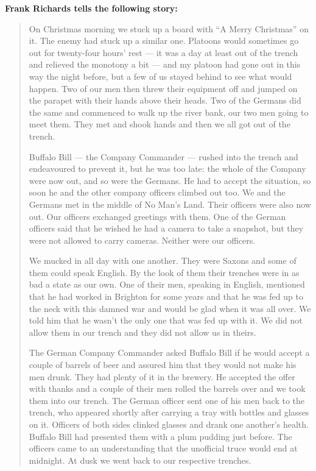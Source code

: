 \vspace{0.5em}

\textbf{Frank Richards tells the following story:}


\begin{quote}
On Christmas morning we stuck up a board with “A Merry Christmas” on it. The enemy had stuck up a similar one. Platoons would sometimes go out for twenty-four hours’ rest — it was a day at least out of the trench and relieved the monotony a bit — and my platoon had gone out in this way the night before, but a few of us stayed behind to see what would happen. Two of our men then threw their equipment off and jumped on the parapet with their hands above their heads. Two of the Germans did the same and commenced to walk up the river bank, our two men going to meet them. They met and shook hands and then we all got out of the trench.

Buffalo Bill — the Company Commander — rushed into the trench and endeavoured to prevent it, but he was too late: the whole of the Company were now out, and so were the Germans. He had to accept the situation, so soon he and the other company officers climbed out too. We and the Germans met in the middle of No Man’s Land. Their officers were also now out. Our officers exchanged greetings with them. One of the German officers said that he wished he had a camera to take a snapshot, but they were not allowed to carry cameras. Neither were our officers.

We mucked in all day with one another. They were Saxons and some of them could speak English. By the look of them their trenches were in as bad a state as our own. One of their men, speaking in English, mentioned that he had worked in Brighton for some years and that he was fed up to the neck with this damned war and would be glad when it was all over. We told him that he wasn’t the only one that was fed up with it. We did not allow them in our trench and they did not allow us in theirs.

The German Company Commander asked Buffalo Bill if he would accept a couple of barrels of beer and assured him that they would not make his men drunk. They had plenty of it in the brewery. He accepted the offer with thanks and a couple of their men rolled the barrels over and we took them into our trench. The German officer sent one of his men back to the trench, who appeared shortly after carrying a tray with bottles and glasses on it. Officers of both sides clinked glasses and drank one another’s health. Buffalo Bill had presented them with a plum pudding just before. The officers came to an understanding that the unofficial truce would end at midnight. At dusk we went back to our respective trenches.


\end{quote}
